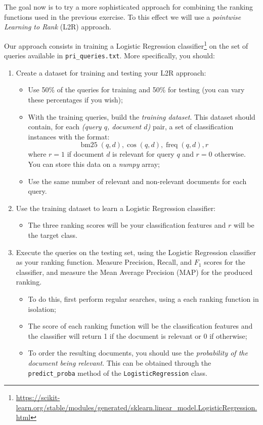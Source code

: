 \documentclass[12pt]{article}
\begin{document}
\section{}

The goal now is to try a more sophisticated approach for combining the ranking functions used in the previous exercise. To this effect we will use a \emph{pointwise Learning to Rank} (L2R) approach.

Our approach consists in training a Logistic Regression classifier\footnote{\url{https://scikit-learn.org/stable/modules/generated/sklearn.linear_model.LogisticRegression.html}} on the set of queries available in \texttt{pri\_queries.txt}. More specifically, you should:
\begin{enumerate}
\item Create a dataset for training and testing your L2R approach:
    \begin{itemize}
    \item Use 50\% of the queries for training and 50\% for testing (you can vary these percentages if you wish);
    \item With the training queries, build the \emph{training dataset}. This dataset should contain, for each \textit{(query $q$, document $d$)} pair, a set of classification instances with the format:
        \begin{displaymath}
            \operatorname{bm25}(q,d), \operatorname{cos}(q,d), \operatorname{freq}(q,d), r
        \end{displaymath}
        where $r = 1$ if document $d$ is relevant for query $q$ and $r=0$ otherwise. You can store this data on a \textit{numpy} array;
    \item Use the same number of relevant and non-relevant documents for each query.
    \end{itemize}
\item Use the training dataset to learn a Logistic Regression classifier:
    \begin{itemize}
    \item The three ranking scores will be your classification features and $r$ will be the target class.
    \end{itemize}
\item Execute the queries on the testing set, using the Logistic Regression classifier as your ranking function. Measure Precision, Recall, and $F_1$ scores for the classifier, and measure the Mean Average Precision (MAP) for the produced ranking.
    \begin{itemize}
    \item To do this, first perform regular searches, using a each ranking function in isolation;
    \item The score of each ranking function will be the classification features and the classifier will return 1 if the document is relevant or 0 if otherwise;
    \item To order the resulting documents, you should use the \emph{probability of the document being relevant}. This can be obtained through the \texttt{predict\_proba} method of the \texttt{LogisticRegression} class.
    \end{itemize}
\end{enumerate}
\end{document}
